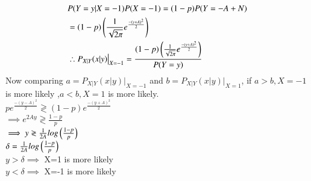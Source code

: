 \documentclass[journal,12pt,twocolumn]{IEEEtran}
\renewcommand\thesection{\arabic{section}}
\begin{document}
\begin{enumerate}[label=\thesection.\arabic*
,ref=\thesection.\theenumi]
\begin{align}
&P(Y=y|X=-1)P(X=-1)=(1-p) P(Y=-A+N)\nonumber\\
&=(1-p)\left(\frac{1}{\sqrt{2 \pi}} e^{\frac{-(y+A)^2}{2}}\right)\\
&\therefore P_{X|Y}(x|y) \big|_{X=-1}=\frac{(1-p)\left(\frac{1}{\sqrt{2\pi}} e^{\frac{-(y+A)^2}{2}}\right)}{P(Y=y)}
\end{align}
Now comparing $a=P_{X|Y}(x|y) \big|_{X=-1}$ and $b=P_{X|Y}(x|y) \big|_{X=1}$, if $a>b, X=-1$ is more likely ,$a<b, X=1$ is more likely.\\
$p e^{\frac{-(y-A)^2}{2}}\gtrless(1-p)e^{\frac{-(y+A)^2}{2}}$\\
$\implies e^{2Ay}\gtrless\frac{1-p}{p}$\\
$\implies y\gtrless\frac{1}{2A}log\left(\frac{1-p}{p}\right)$\\
$\delta=\frac{1}{2A}log\left(\frac{1-p}{p}\right)$\\
$y>\delta \implies$ X=1 is more likely\\
$y<\delta \implies$ X=-1 is more likely
		\end{enumerate}
\end{document}
